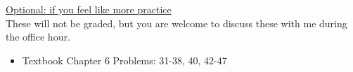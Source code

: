 \documentclass[11pt]{article}
\begin{document}
\vspace{12pt}

\underline{Optional: if you feel like more practice}\\
These will not be graded, but you are welcome to discuss these with me during the office hour.

\begin{itemize}


\item Textbook  Chapter 6 Problems: 31-38, 40, 42-47

\end{itemize}
\end{document}
